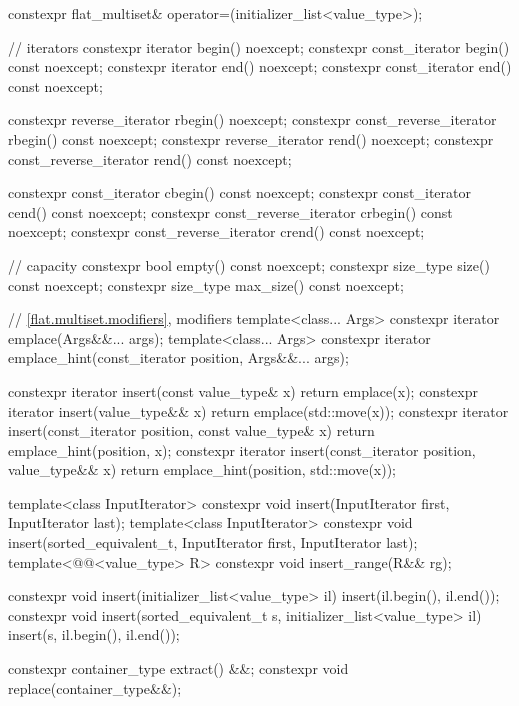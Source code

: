 \begin{codeblock}
{{    constexpr flat_multiset& operator=(initializer_list<value_type>);

    // iterators
    constexpr iterator               begin() noexcept;
    constexpr const_iterator         begin() const noexcept;
    constexpr iterator               end() noexcept;
    constexpr const_iterator         end() const noexcept;

    constexpr reverse_iterator       rbegin() noexcept;
    constexpr const_reverse_iterator rbegin() const noexcept;
    constexpr reverse_iterator       rend() noexcept;
    constexpr const_reverse_iterator rend() const noexcept;

    constexpr const_iterator         cbegin() const noexcept;
    constexpr const_iterator         cend() const noexcept;
    constexpr const_reverse_iterator crbegin() const noexcept;
    constexpr const_reverse_iterator crend() const noexcept;

    // capacity
    constexpr bool empty() const noexcept;
    constexpr size_type size() const noexcept;
    constexpr size_type max_size() const noexcept;

    // \ref{flat.multiset.modifiers}, modifiers
    template<class... Args> constexpr iterator emplace(Args&&... args);
    template<class... Args>
      constexpr iterator emplace_hint(const_iterator position, Args&&... args);

    constexpr iterator insert(const value_type& x)
      { return emplace(x); }
    constexpr iterator insert(value_type&& x)
      { return emplace(std::move(x)); }
    constexpr iterator insert(const_iterator position, const value_type& x)
      { return emplace_hint(position, x); }
    constexpr iterator insert(const_iterator position, value_type&& x)
      { return emplace_hint(position, std::move(x)); }

    template<class InputIterator>
      constexpr void insert(InputIterator first, InputIterator last);
    template<class InputIterator>
      constexpr void insert(sorted_equivalent_t, InputIterator first, InputIterator last);
    template<@@<value_type> R>
      constexpr void insert_range(R&& rg);

    constexpr void insert(initializer_list<value_type> il)
      { insert(il.begin(), il.end()); }
    constexpr void insert(sorted_equivalent_t s, initializer_list<value_type> il)
      { insert(s, il.begin(), il.end()); }

    constexpr container_type extract() &&;
    constexpr void replace(container_type&&);

}}
\end{codeblock}
